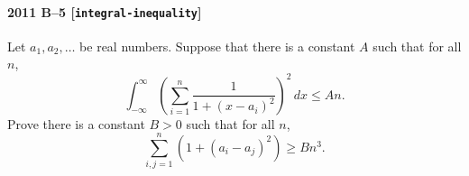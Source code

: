 \paragraph{2011 B--5 \textnormal{[\texttt{integral-inequality}]}}
Let $a_1, a_2, \dots$ be real numbers. Suppose that there is
a constant $A$ such that for all $n$,
\[
\int_{-\infty}^\infty \left( \sum_{i=1}^n \frac{1}{1 + (x-a_i)^2} \right)^2\,dx \leq An.
\]
Prove there is a constant $B>0$ such that for all $n$,
\[
\sum_{i,j=1}^n (1 + (a_i - a_j)^2) \geq Bn^3.
\]
